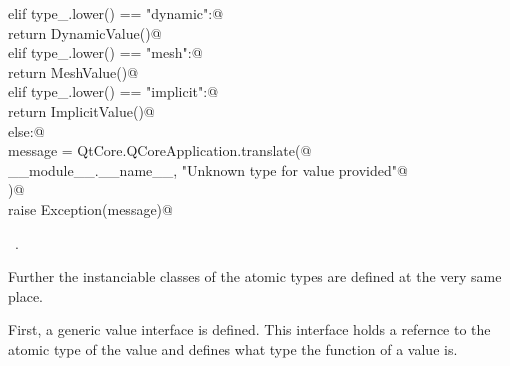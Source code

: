 \documentclass[
    a4paper,      %
    10pt,         %
    openright,    %
    notitlepage,  %
    parskip=half, %
]{scrreprt}       %
\theoremstyle{definition}                    %
\begin{document}
\begin{flushleft}
\begin{minipage}{\linewidth}
\begin{list}{}{}
\mbox{}\lstinline@    elif type_.lower() == "dynamic":@\\
\mbox{}\lstinline@        return DynamicValue()@\\
\mbox{}\lstinline@    elif type_.lower() == "mesh":@\\
\mbox{}\lstinline@        return MeshValue()@\\
\mbox{}\lstinline@    elif type_.lower() == "implicit":@\\
\mbox{}\lstinline@        return ImplicitValue()@\\
\mbox{}\lstinline@    else:@\\
\mbox{}\lstinline@        message = QtCore.QCoreApplication.translate(@\\
\mbox{}\lstinline@            __module__.__name__, "Unknown type for value provided"@\\
\mbox{}\lstinline@        )@\\
\mbox{}\lstinline@        raise Exception(message)@{\NWsep}
\end{list}
\vspace{-1.5ex}
\footnotesize
\begin{list}{}{\setlength{\itemsep}{-\parsep}\setlength{\itemindent}{-\leftmargin}}
\item \NWtxtMacroRefIn\ .

\item{}
\end{list}
\end{minipage}\vspace{4ex}
\end{flushleft}
Further the instanciable classes of the atomic types are defined at the very same
place.

First, a generic value interface is defined. This interface holds a refernce to
the atomic type of the value and defines what type the function of a value is.
\end{document}
